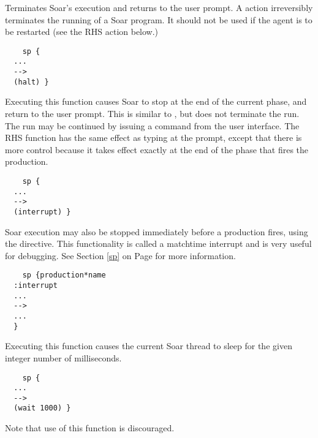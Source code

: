 \begin{description}
	
\item [\soarb{halt} ---] 
	Terminates Soar's execution and returns to the user prompt.  A  action irreversibly terminates the running of a Soar program. It should not be used if the agent is to be restarted (see the  RHS action below.)
	
	\begin{verbatim}
	sp {
  ...
  -->
  (halt) }
	\end{verbatim} 

\item [\soarb{interrupt} --- ]
	Executing this function causes Soar to stop at the end of the current phase, and return to the user prompt. This is similar to , but does not terminate the run. The run may be continued by issuing a  command from the user interface.  The  RHS function has the same effect as typing  at the prompt, except that there is more control because it takes effect exactly at the end of the phase that fires the production.
	
	\begin{verbatim}
	sp {
  ...
  -->
  (interrupt) }
	\end{verbatim}
		
	Soar execution may also be stopped immediately before a production fires, using the  directive. This functionality is called a matchtime interrupt and is very useful for debugging. See Section	\ref{sp} on Page \pageref{sp} for more information.
	
	\begin{verbatim}
	sp {production*name
  :interrupt
  ...
  -->
  ...
  }
	\end{verbatim}

\item [\soarb{wait} --- ]
	Executing this function causes the current Soar thread to sleep for the given integer number of milliseconds.
	
	\begin{verbatim}
	sp {
  ...
  -->
  (wait 1000) }
	\end{verbatim}

	Note that use of this function is discouraged.
	
\end{description}

